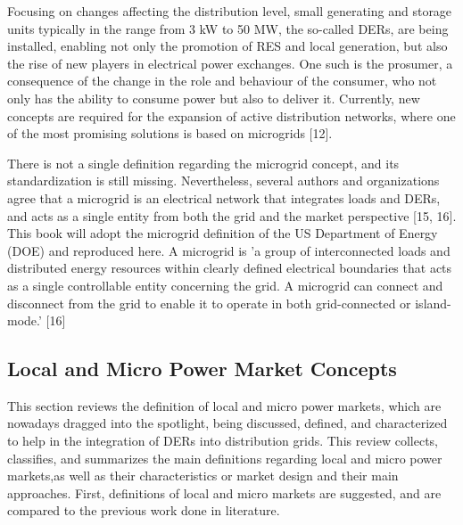 Focusing on changes affecting the distribution level, small generating and storage units typically in the range from 3 kW to 50 MW, the so-called DERs, are being installed, enabling not only the promotion of RES and local generation, but also the rise of new players in electrical power exchanges. One such is the prosumer, a consequence of the change in the role and behaviour of the consumer, who not only has the ability to consume power but also to deliver it. Currently, new concepts are required for the expansion of active distribution networks, where one of the most promising solutions is based on microgrids [12].

There is not a single definition regarding the microgrid concept, and its standardization is still missing. Nevertheless, several authors and organizations agree that a microgrid is an electrical network that integrates loads and DERs, and acts as a single entity from both the grid and the market perspective [15, 16]. This book will adopt the microgrid definition of the US Department of Energy (DOE) and reproduced here. A microgrid is 'a group of interconnected loads and distributed energy resources within clearly defined
electrical boundaries that acts as a single controllable entity concerning the grid. A microgrid can connect and disconnect from the grid to enable it to operate in both grid-connected or island-mode.' [16]

\subsection{Local and Micro Power Market Concepts}
This section reviews the definition of local and micro power markets, which are nowadays dragged into the spotlight, being discussed, defined, and characterized to help in the integration of DERs into distribution grids. This review collects, classifies, and summarizes the main definitions regarding local and micro power markets,as well as their characteristics or market design and their main approaches. First, definitions of local and micro markets are suggested, and are compared to the previous work done in literature.

